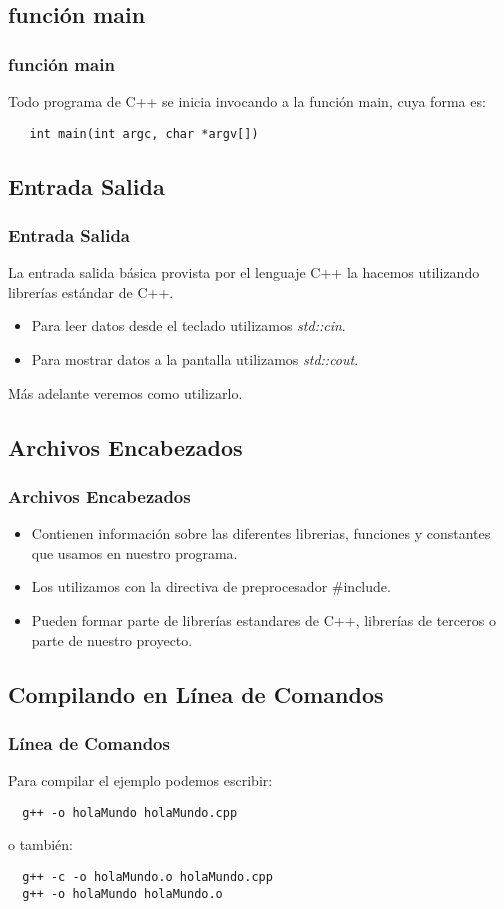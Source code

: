 \documentclass{beamer}
\begin{document}
\subsection{función main}

\begin{frame}[fragile]
\frametitle{función main}

Todo programa de C++ se inicia invocando a la función main, cuya forma es:
\begin{verbatim}
   int main(int argc, char *argv[])
\end{verbatim}
\end{frame}

\subsection{Entrada Salida}
\begin{frame}[fragile]
\frametitle{Entrada Salida}

La entrada salida básica provista por el lenguaje C++ la hacemos utilizando librerías estándar de C++.
\begin{itemize}
 \item Para leer datos desde el teclado utilizamos \emph{std::cin}.
 \item Para mostrar datos a la pantalla utilizamos \emph{std::cout}.
\end{itemize}

Más adelante veremos como utilizarlo.
\end{frame}

\subsection{Archivos Encabezados}
\begin{frame}
\frametitle{Archivos Encabezados}

\begin{itemize}
 \item Contienen información sobre las diferentes librerias, funciones y constantes que usamos en nuestro programa.
 \item Los utilizamos con la directiva de preprocesador \#include.
 \item Pueden formar parte de librerías estandares de C++, librerías de terceros o parte de nuestro proyecto.
\end{itemize}
\end{frame}

\subsection{Compilando en Línea de Comandos}
\begin{frame}[fragile]
\frametitle{Línea de Comandos}
Para compilar el ejemplo podemos escribir:
\begin{verbatim}
  g++ -o holaMundo holaMundo.cpp
\end{verbatim}
o también:
\begin{verbatim}
  g++ -c -o holaMundo.o holaMundo.cpp
  g++ -o holaMundo holaMundo.o
\end{verbatim}
\end{frame}
\end{document}
